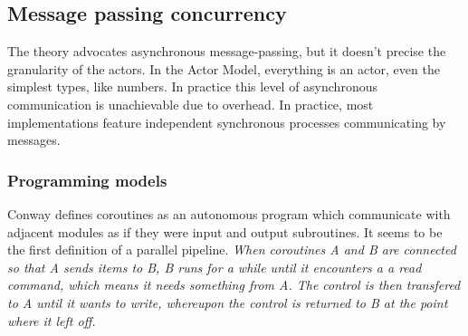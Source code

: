 









\subsection{Message passing concurrency} \label{chapter3:parallel-execution:message-passing}


The theory advocates asynchronous message-passing, but it doesn't precise the granularity of the actors.
In the Actor Model, everything is an actor, even the simplest types, like numbers.
In practice this level of asynchronous communication is unachievable due to overhead.
In practice, most implementations feature independent synchronous processes communicating by messages.

\subsubsection{Programming models}

Conway defines coroutines as an autonomous program which communicate with adjacent modules as if they were input and output subroutines.\cite{Conway1963}
It seems to be the first definition of a parallel pipeline.
\textit{When coroutines A and B are connected so that A sends items to B, B runs for a while until it encounters a a read command, which means it needs something from A. The control is then transfered to A until it wants to write, whereupon the control is returned to B at the point where it left off.}

